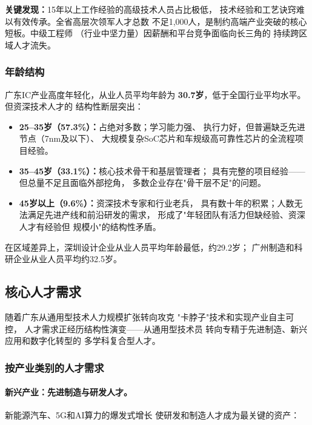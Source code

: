 \documentclass[12pt,a4paper]{article}
\begin{document}
\textbf{关键发现：}15年以上工作经验的高级技术人员占比极低，
技术经验和工艺诀窍难以有效传承。全省高层次领军人才总数
不足1,000人，是制约高端产业突破的核心短板。中级工程师
（行业中坚力量）因薪酬和平台竞争面临向长三角的
持续跨区域人才流失。

\subsubsection{年龄结构}

广东IC产业高度年轻化，从业人员平均年龄为
\textbf{30.7岁}，低于全国行业平均水平。但资深技术人才的
结构性断层突出：

\begin{itemize}
    \item \textbf{25--35岁（57.3\%）：}占绝对多数；学习能力强、
          执行力好，但普遍缺乏先进节点（7nm及以下）、
          大规模复杂SoC芯片和车规级高可靠性芯片的全流程项目经验。
    \item \textbf{35--45岁（33.1\%）：}核心技术骨干和基层管理者；
          具有完整的项目经验——但总量不足且面临外部挖角，
          多数企业存在"骨干层不足"的问题。
    \item \textbf{45岁以上（9.6\%）：}资深技术专家和行业老兵，
          具有数十年的积累；人数无法满足先进产线和前沿研发的需求，
          形成了"年轻团队有活力但缺经验、资深人才有经验但
          规模小"的结构性矛盾。
\end{itemize}

在区域差异上，深圳设计企业从业人员平均年龄最低，约29.2岁；
广州制造和科研企业从业人员平均约32.5岁。

\subsection{核心人才需求}
\label{sec:talent_demand}

随着广东从通用型技术人力规模扩张转向攻克
"卡脖子"技术和实现产业自主可控，
人才需求正经历结构性演变——从通用型技术员
转向专精于先进制造、新兴应用和数字化转型的
多学科复合型人才。

\subsubsection{按产业类别的人才需求}

\paragraph{新兴产业：先进制造与研发人才。}
新能源汽车、5G和AI算力的爆发式增长
使研发和制造人才成为最关键的资产：
\end{document}
